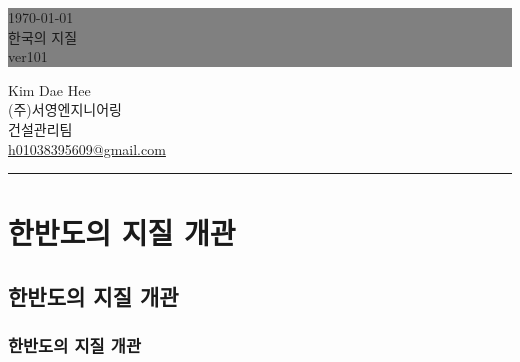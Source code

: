 \documentclass[12pt,a4paper]{book}
\newcommand{\SectionMargin}			{\newpage  \null \vskip 0cm}
\begin{document}
			\begin{titlepage}
			\thispagestyle{empty}				%
			\colorbox	{grey}
						{ \parbox[t]{1.0\linewidth}
						{
						\vspace*{1.2cm} 
						\fontsize{20}{20} \rmfamily \hfill \today 		\\ [0.4cm] \null
						\fontsize{40}{20} \rmfamily \hfill 한국의 지질\\ [0.4cm] \null
						\fontsize{20}{50} \rmfamily \hfill ver101
						\vspace*{0.8cm} 
						} }
			\vfill
			\hfill Kim Dae Hee\\ \null
			\hfill (주)서영엔지니어링\\ \null
			\hfill 건설관리팀\\ \null
			\hfill \url{h01038395609@gmail.com} \\ \null
			\hfill \rule{0.4\linewidth}{1pt}
			\end{titlepage}																														\clearpage
% 


			\dominitoc		
			
			\tableofcontents
			\listoffigures
			\listoftables
	
	

		\part{한반도의 지질 개관}

\newpage
\chapter{한반도의 지질 개관}



	\SectionMargin
	\section{	한반도의 지질 개관}
\end{document}
